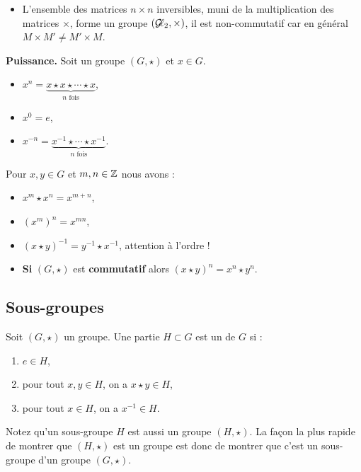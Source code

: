 \documentclass[10pt,class=article,crop=false]{standalone}
\begin{document}
\begin{multicols}{2}
\begin{itemize}
	\item L'ensemble des matrices $n\times n$ inversibles,
	muni de la multiplication des matrices $\times$, forme un groupe $(\mathcal{G}\!\ell_2,\times)$, il est non-commutatif car en général $M\times M' \neq M'\times M$.
	
	
	
\end{itemize}



\textbf{Puissance.} Soit un groupe $(G,\star)$ et $x \in G$.
\begin{itemize}
	\item $x^{n} = \underbrace{x\star x \star \cdots \star x}_{n \text{ fois}}$,
	\item $x^0 = e$,
	\item $x^{-n} = \underbrace{x^{-1}\star \cdots \star x^{-1}}_{n \text{ fois}}$.
\end{itemize}

Pour $x,y \in G$ et $m,n \in\mathbb{Z}$ nous avons :
\begin{itemize}
	\item $x^m \star x^n = x^{m+n}$,
	\item $(x^m)^n = x^{mn}$,
	\item $(x \star y)^{-1} = y^{-1} \star x^{-1}$, \quad attention à l'ordre !
	\item \textbf{Si} $(G,\star)$ est \textbf{commutatif} alors $(x\star y)^n = x^n \star y^n$.
\end{itemize}




\subsection{Sous-groupes}

Soit $(G,\star)$ un groupe.	Une partie $H \subset G$ est un   de $G$ si :
	\begin{enumerate}
		\item $e \in H$,
		\item pour tout $x, y \in H$, on a $x \star y \in H$,
		\item pour tout $x \in H$, on a $x^{-1} \in H$.
	\end{enumerate}

Notez qu'un sous-groupe $H$ est aussi un groupe $(H,\star)$.
La façon la plus rapide de montrer que $(H,\star)$ est un groupe est donc de montrer que c'est un sous-groupe d'un groupe $(G,\star)$.


\end{multicols}
\end{document}
